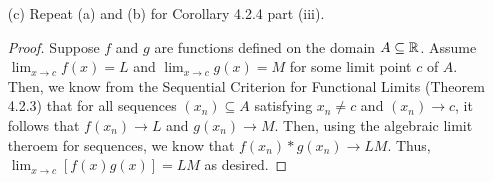 \documentclass[12pt,letterpaper]{article}
\begin{document}
\begin{itemize}[leftmargin=!,labelindent=5pt]
\begin{itemize}
                    \begin{proof}
                        Suppose $f$ and $g$ are functions defined on the domain $A \subseteq \bbR$.
                        Assume $\lim_{x \to c} f(x) = L$ and $\lim_{x \to c} g(x) = M$ for some limit point $c$ of $A$.
                        Let $\epsilon > 0$.
                        Need to show that $\lim_{x \to c} [f(x) + g(x)] = L + M$, that is there exists $\delta > 0$ such that whenever $x \in A$ and $0 < \abs{x-c} < \delta$, it follows that $\abs{(f(x) + g(x)) - L - M} < \epsilon$.
                        Since $\lim_{x \to c} f(x) = L$, we know that there exists a $\delta_1>0$ such that whenever $x \in A$ and $0 < \abs{x-c} < \delta_1$, it follows that $\abs{f(x) - L} < \frac{\epsilon}{2}$.
                        Similarly, since $\lim_{x \to c} g(x) = M$, we know that there exists a $\delta_2>0$ such that whenever $x \in A$ and $0 < \abs{x-c} < \delta_2$, it follows that $\abs{g(x) - M} < \frac{\epsilon}{2}$.
                        So, choose $\delta$ such that $\delta = \min\{\delta_1, \delta_2\}$.
                        Then, whenever $0 < \abs{x-c} < \delta$:
                        \begin{align*}
                            \abs{(f(x) + g(x)) - (L + M)} &= \abs{(f(x) - L) + (g(x) - M)} \\
                            &\leq \abs{(f(x) - L)} + \abs{(g(x) - M)}\\
                            &< \frac{\epsilon}{2} + \frac{\epsilon}{2} = \epsilon.
                        \end{align*}
                        So, when $x \in A$ and $0 < \abs{x-c} < \delta$, $\abs{(f(x) + g(x)) - (L + M)} < \epsilon$ as desired.
                    \end{proof}

                \item [(c)] Repeat (a) and (b) for Corollary 4.2.4 part (iii).
                        \begin{proof}
                            Suppose $f$ and $g$ are functions defined on the domain $A \subseteq \bbR$.
                            Assume $\lim_{x \to c} f(x) = L$ and $\lim_{x \to c} g(x) = M$ for some limit point $c$ of $A$.
                            Then, we know from the Sequential Criterion for Functional Limits (Theorem 4.2.3) that for all sequences $(x_n) \subseteq A$ satisfying $x_n \neq c$ and $(x_n) \to c$, it follows that $f(x_n) \to L$ and $g(x_n) \to M$.
                            Then, using the algebraic limit theroem for sequences, we know that $f(x_n) * g(x_n) \to LM$.
                            Thus, $\lim_{x \to c} [f(x)g(x)] = LM$ as desired.
                        \end{proof}


\end{itemize}
\end{itemize}
\end{document}
